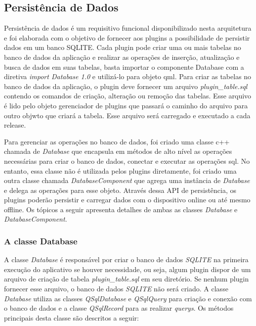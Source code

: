 \subsection{Persistência de Dados}\label{sec:solucao-desenvolvida}
Persistência de dados é um requisitivo funcional disponibilizado nesta arquitetura e foi elaborada com o objetivo de fornecer aos plugins a possibilidade de persistir dados em um banco SQLITE. Cada plugin pode criar uma ou mais tabelas no banco de dados da aplicação e realizar as operações de inserção, atualização e busca de dados em suas tabelas, basta importar o componente Database com a diretiva \textit{import Database 1.0} e utilizá-lo para objeto qml. Para criar as tabelas no banco de dados da aplicação, o plugin deve fornecer um arquivo \textit{plugin\_table.sql} contendo os comandos de criação, alteração ou remoção das tabelas. Esse arquivo é lido pelo objeto gerenciador de plugins que passará o caminho do arquivo para outro objwto que criará a tabela. Esse arquivo será carregado e executado a cada release.\par

Para gerenciar as operações no banco de dados, foi criado uma classe c++ chamada de \textit{Database} que encapsula em métodos de alto nível as operações necessárias para criar o banco de dados, conectar e executar as operações sql. No entanto, essa classe não é utilizada pelos plugins diretamente, foi criado uma outra classe chamada \textit{DatabaseComponent} que agrega uma instância de \textit{Database} e delega as operações para esse objeto. Através dessa API de persistência, os plugins poderão persistir e carregar dados com o dispositivo online ou até mesmo offline. Os tópicos a seguir apresenta detalhes de ambas as classes \textit{Database} e \textit{DatabaseComponent}.


\subsubsection{A classe Database}\label{sec:solucao-desenvolvida}
A classe \textit{Database} é responsável por criar o banco de dados \textit{SQLITE} na primeira execução do aplicativo se houver necessidade, ou seja, algum plugin dispor de um arquivo de criação de tabela \textit{plugin\_table.sql} em seu diretório. Se nenhum plugin fornecer esse arquivo, o banco de dados \textit{SQLITE} não será criado. A classe \textit{Database} utiliza as classes \textit{QSqlDatabase} e \textit{QSqlQuery} para criação e conexão com o banco de dados e a classe \textit{QSqlRecord} para as realizar \textit{querys}. Os métodos principais desta classe são descritos a seguir:

